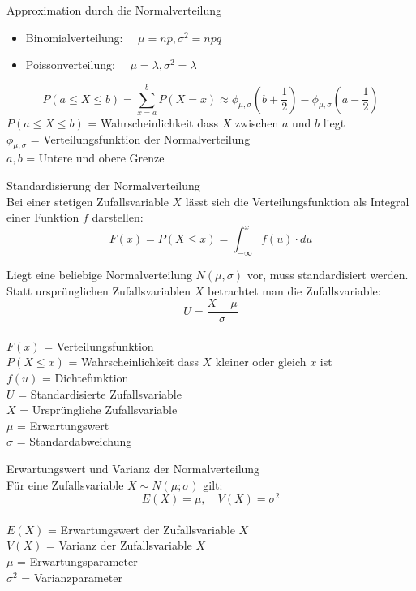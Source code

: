 \begin{theorem}{Approximation durch die Normalverteilung}
\begin{itemize}
  \item Binomialverteilung: $\quad \mu=np, \sigma^2=npq$
  \item Poissonverteilung: $\quad \mu=\lambda, \sigma^2=\lambda$
\end{itemize}

$$
P(a \leq X \leq b)=\sum_{x=a}^{b} P(X=x) \approx \phi_{\mu,\sigma}(b+\frac{1}{2})-\phi_{\mu,\sigma}(a-\frac{1}{2})
$$
$P(a \leq X \leq b)$ = Wahrscheinlichkeit dass $X$ zwischen $a$ und $b$ liegt\\
$\phi_{\mu,\sigma}$ = Verteilungsfunktion der Normalverteilung\\
$a, b$ = Untere und obere Grenze\\
\end{theorem}

\begin{definition}{Standardisierung der Normalverteilung}\\
Bei einer stetigen Zufallsvariable $X$ lässt sich die Verteilungsfunktion als Integral einer Funktion $f$ darstellen:
$$
F(x) = P(X \leq x) = \int_{-\infty}^x f(u) \cdot du
$$

Liegt eine beliebige Normalverteilung $N(\mu,\sigma)$ vor, muss standardisiert werden. Statt ursprünglichen Zufallsvariablen $X$ betrachtet man die Zufallsvariable:
$$
U = \frac{X-\mu}{\sigma}
$$
\\
$F(x)$ = Verteilungsfunktion\\
$P(X \leq x)$ = Wahrscheinlichkeit dass $X$ kleiner oder gleich $x$ ist\\
$f(u)$ = Dichtefunktion\\
$U$ = Standardisierte Zufallsvariable\\
$X$ = Ursprüngliche Zufallsvariable\\
$\mu$ = Erwartungswert\\
$\sigma$ = Standardabweichung\\
\end{definition}
\begin{definition}{Erwartungswert und Varianz der Normalverteilung}\\
Für eine Zufallsvariable $X \sim N(\mu;\sigma)$ gilt:
$$
E(X) = \mu, \quad V(X) = \sigma^2
$$
\\
$E(X)$ = Erwartungswert der Zufallsvariable $X$\\
$V(X)$ = Varianz der Zufallsvariable $X$\\
$\mu$ = Erwartungsparameter\\
$\sigma^2$ = Varianzparameter\\
\end{definition}

